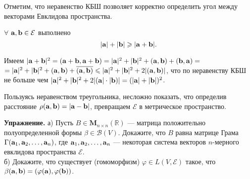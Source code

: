\otstup
Отметим, что неравенство КБШ позволяет корректно определить угол между векторами Евклидова пространства.

\begin{sled2}
$\forall$ $\mathbf{a}, \mathbf{b}\in \mathcal{E}$ выполнено $$|\mathbf{a}|+|\mathbf{b}| \geqslant |\mathbf{a} + \mathbf{b}| .$$
\end{sled2}
\dok
Имеем %
$|\mathbf{a} + \mathbf{b}|^2 = (\mathbf{a} + \mathbf{b}, \mathbf{a} + \mathbf{b}) = |\mathbf{a}|^2+ |\mathbf{b}|^2 
+ (\mathbf{a}, \mathbf{b}) + (\mathbf{b}, \mathbf{a})=  $\\
$= |\mathbf{a}|^2+ |\mathbf{b}|^2 
+ (\mathbf{a}, \mathbf{b}) + \overline{(\mathbf{a}, \mathbf{b})} \leqslant |\mathbf{a}|^2+ |\mathbf{b}|^2 
+ 2 |(\mathbf{a}, \mathbf{b})|$, что по неравенству КБШ не больше
чем $ |\mathbf{a}|^2+ |\mathbf{b}|^2 + 2 |(\mathbf{a}|\cdot |\mathbf{b})|  =  (|\mathbf{a}| + |\mathbf{b}|)^2 $.
\edok

\otstup

Пользуясь неравенством треугольника, несложно показать, что 
определив расстояние $\rho(\mathbf{a}, \mathbf{b}) = |\mathbf{a} - \mathbf{b}|$, 
превращаем $\mathcal{E}$ в метрическое пространство. 





\otstup 

{\bf Упражнение.} а) Пусть $B\in \mathbf{M}_{n\times n} (\mathbb{R})$ --- матрица положительно полуопределенной формы $\beta \in \mathcal{B}(V)$.
Докажите, что $B$ равна матрице Грама $\Gamma (\mathbf{a}_1, \mathbf{a}_2, \ldots, \mathbf{a}_n)$, где 
$\mathbf{a}_1, \mathbf{a}_2, \ldots, \mathbf{a}_n$ --- некоторая система векторов $n$-мерного евклидова пространства
$\mathcal{E}$.\\
б) Докажите, что существует (гомоморфизм) $\varphi\in L(V, \mathcal{E})$ такое, что 
$\beta (\mathbf{a}, \mathbf{b}) = (\varphi (\mathbf{a}), \varphi (\mathbf{b}))$.

